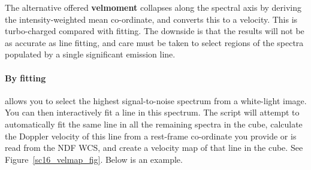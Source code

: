 \documentclass[twoside,11pt]{starlink}
\begin{document}
The alternative offered \textbf{velmoment} collapses along the spectral
axis by deriving the intensity-weighted mean co-ordinate, and converts
this to a velocity.  This is turbo-charged compared with fitting.  The
downside is that the results will not be as accurate as line fitting,
and care must be taken to select regions of the spectra populated by a
single significant emission line.

\paragraph{\label{sc16_velfit}\latex{\vspace*{0.8em}}By
fitting\latex{\newline}}

\hspace*{-2.1ex} allows you to select the highest
signal-to-noise spectrum from a white-light image.  You can then
interactively fit a line in this spectrum.  The script will attempt to
automatically fit the same line in all the remaining spectra in the
cube, calculate the Doppler velocity of this line from a rest-frame
co-ordinate you provide or is read from the NDF WCS, and create a
velocity map of that line in the cube.  See
Figure~\ref{sc16_velmap_fig}.  Below is an
example.

\end{document}
